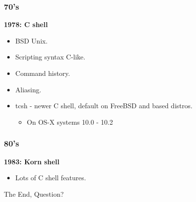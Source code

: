 \documentclass[aspectratio=169]{beamer}
\begin{document}

\begin{frame}
	\frametitle{ 70's}
	\textbf{1978: C shell}
	\begin{itemize}
		\item BSD Unix.
		\item Scripting syntax C-like. 
		\item Command history.
		\item Aliasing.
		\item tcsh - newer C shell, default on FreeBSD and based distros.
		\begin{itemize}
			\item On OS-X systems 10.0 - 10.2
		\end{itemize}
	\end{itemize}
\end{frame}


\begin{frame}
	\frametitle{ 80's}
	\textbf{1983: Korn shell}
	\begin{itemize}
		\item Lots of C shell features.
	\end{itemize}
\end{frame}




\begin{frame}
    \Huge{\centerline{The End, Question?}}
\end{frame}

\end{document}
